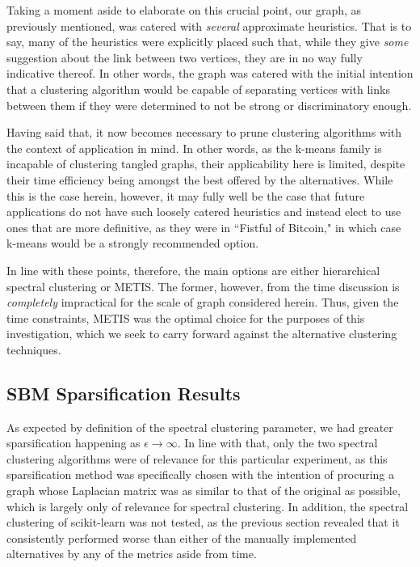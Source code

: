 \documentclass{article}
\begin{document}
Taking a moment aside to elaborate on this crucial point, our graph, as previously mentioned, was catered with \textit{several} approximate heuristics. That is to say, many of the heuristics were explicitly placed such that, while they give \textit{some} suggestion about the link between two vertices, they are in no way fully indicative thereof. In other words, the graph was catered with the initial intention that a clustering algorithm would be capable of separating vertices with links between them if they were determined to not be strong or discriminatory enough. 

Having said that, it now becomes necessary to prune clustering algorithms with the context of application in mind. In other words, as the k-means family is incapable of clustering tangled graphs, their applicability here is limited, despite their time efficiency being amongst the best offered by the alternatives. While this is the case herein, however, it may fully well be the case that future applications do not have such loosely catered heuristics and instead elect to use ones that are more definitive, as they were in ``Fistful of Bitcoin," in which case k-means would be a strongly recommended option.

In line with these points, therefore, the main options are either hierarchical spectral clustering or METIS. The former, however, from the time discussion is \textit{completely} impractical for the scale of graph considered herein. Thus, given the time constraints, METIS was the optimal choice for the purposes of this investigation, which we seek to carry forward against the alternative clustering techniques.

\subsection{SBM Sparsification Results}
As expected by definition of the spectral clustering parameter, we had greater sparsification happening as $\epsilon\rightarrow\infty$. In line with that, only the two spectral clustering algorithms were of relevance for this particular experiment, as this sparsification method was specifically chosen with the intention of procuring a graph whose Laplacian matrix was as similar to that of the original as possible, which is largely only of relevance for spectral clustering. In addition, the spectral clustering of scikit-learn was not tested, as the previous section revealed that it consistently performed worse than either of the manually implemented alternatives by any of the metrics aside from time. 
\end{document}
